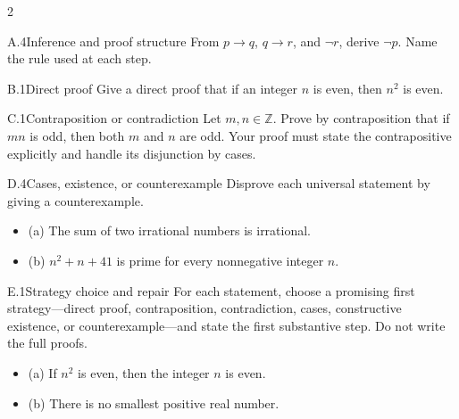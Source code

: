 \documentclass[9pt]{extarticle}
\begin{document}
\CoreWorkArea
\FormBreak
{}
\begin{multicols}{2}
\begin{CoreProblem}{A.4}{Inference and proof structure}
From $p\to q$, $q\to r$, and $\neg r$, derive $\neg p$. Name the rule used at
each step.
\end{CoreProblem}
\begin{CoreProblem}{B.1}{Direct proof}
Give a direct proof that if an integer $n$ is even, then $n^2$ is even.
\end{CoreProblem}
\begin{CoreProblem}{C.1}{Contraposition or contradiction}
Let $m,n\in\mathbb Z$. Prove by contraposition that if $mn$ is odd, then both
$m$ and $n$ are odd. Your proof must state the contrapositive explicitly and
handle its disjunction by cases.
\end{CoreProblem}
\columnbreak
\begin{CoreProblem}{D.4}{Cases, existence, or counterexample}
Disprove each universal statement by giving a counterexample.
\begin{itemize}
  \item (a) The sum of two irrational numbers is irrational.
  \item (b) $n^2+n+41$ is prime for every nonnegative integer $n$.
\end{itemize}
\end{CoreProblem}
\begin{CoreProblem}{E.1}{Strategy choice and repair}
For each statement, choose a promising first strategy---direct proof,
contraposition, contradiction, cases, constructive existence, or
counterexample---and state the first substantive step. Do not write the full
proofs.
\begin{itemize}
  \item (a) If $n^2$ is even, then the integer $n$ is even.
  \item (b) There is no smallest positive real number.
\end{itemize}
\end{CoreProblem}
\end{multicols}
\CoreWorkArea
\FormBreak
{}
\end{document}
